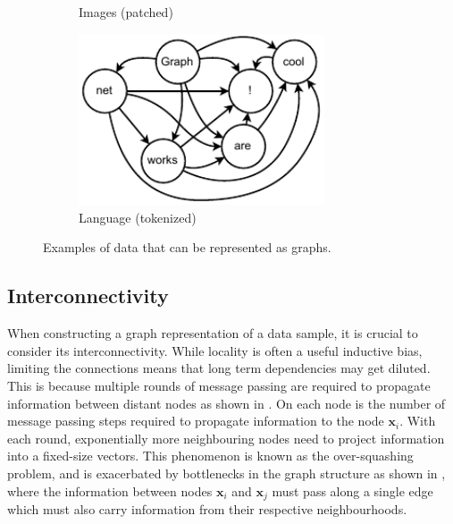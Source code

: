 \begin{figure}
\begin{subfigure}[b]{0.45\textwidth}
        \caption{Images (patched)}
        \label{fig:dog}
    \end{subfigure}
    \begin{subfigure}[b]{0.45\textwidth}
        \centering
        \includegraphics[width=0.8\textwidth]{Figures/transformers/text.pdf}
        \caption{Language (tokenized)}
        \label{fig:text}
    \end{subfigure}
    \caption{Examples of data that can be represented as graphs.}
    \label{fig:graph_examples}
\end{figure}

\subsection{Interconnectivity}

When constructing a graph representation of a data sample, it is crucial to consider its interconnectivity.
While locality is often a useful inductive bias, limiting the connections means that long term dependencies may get diluted.
This is because multiple rounds of message passing are required to propagate information between distant nodes as shown in .
On each node is the number of message passing steps required to propagate information to the node $\mathbf{x}_i$.
With each round, exponentially more neighbouring nodes need to project information into a fixed-size vectors.
This phenomenon is known as the over-squashing problem, and is exacerbated by bottlenecks in the graph structure as shown in , where the information between nodes $\mathbf{x}_i$ and $\mathbf{x}_j$ must pass along a single edge which must also carry information from their respective neighbourhoods.


